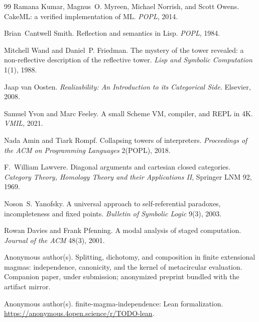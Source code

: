 \documentclass[acmsmall,screen,review]{acmart}
\newif\ifanon
\begin{document}
\begin{thebibliography}{99}
Ramana Kumar, Magnus~O. Myreen, Michael Norrish, and Scott Owens.
\newblock CakeML: a verified implementation of ML.
\newblock \emph{POPL}, 2014.

Brian~Cantwell Smith.
\newblock Reflection and semantics in Lisp.
\newblock \emph{POPL}, 1984.

Mitchell Wand and Daniel~P. Friedman.
\newblock The mystery of the tower revealed: a non-reflective
  description of the reflective tower.
\newblock \emph{Lisp and Symbolic Computation} 1(1), 1988.

Jaap van Oosten.
\newblock \emph{Realizability: An Introduction to its Categorical
  Side}.
\newblock Elsevier, 2008.

Samuel Yvon and Marc Feeley.
\newblock A small Scheme VM, compiler, and REPL in 4K.
\newblock \emph{VMIL}, 2021.

Nada Amin and Tiark Rompf.
\newblock Collapsing towers of interpreters.
\newblock \emph{Proceedings of the ACM on Programming Languages}
  2(POPL), 2018.

F.~William Lawvere.
\newblock Diagonal arguments and cartesian closed categories.
\newblock \emph{Category Theory, Homology Theory and their
  Applications II}, Springer LNM 92, 1969.

Noson~S. Yanofsky.
\newblock A universal approach to self-referential paradoxes,
  incompleteness and fixed points.
\newblock \emph{Bulletin of Symbolic Logic} 9(3), 2003.

Rowan Davies and Frank Pfenning.
\newblock A modal analysis of staged computation.
\newblock \emph{Journal of the ACM} 48(3), 2001.

\ifanon
{}
Anonymous author(s).
\newblock Splitting, dichotomy, and composition in finite extensional
  magmas: independence, canonicity, and the kernel of metacircular
  evaluation.
\newblock Companion paper, under submission; anonymized preprint
  bundled with the artifact mirror.

Anonymous author(s).
\newblock finite-magma-independence: Lean formalization.
\newblock \url{https://anonymous.4open.science/r/TODO-lean}.


\end{thebibliography}
\end{document}
